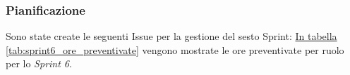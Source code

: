 \subsubsection{Pianificazione}
\label{sec:sprint6_pianificazione}
Sono state create le seguenti Issue per la gestione del sesto Sprint: 
\hyperref[tab:sprint6_ore_preventivate]{In tabella \ref{tab:sprint6_ore_preventivate}} vengono mostrate le ore preventivate per ruolo per lo \textit{Sprint 6}.

\begin{table}[H]
    \centering
    \caption{Ore preventivate per ruolo Sprint 6}
    \label{tab:sprint6_ore_preventivate}
\end{table}